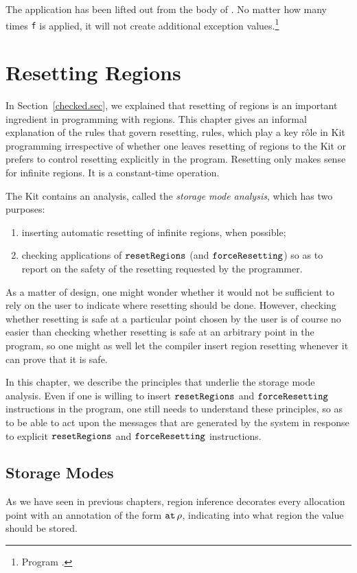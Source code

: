 \documentclass[12pt]{book}
\begin{document}
The application  has been lifted out from the body of
. No matter how many times {\tt f} is applied, it will not
create additional exception values.\footnote{Program
  .}

\chapter{Resetting Regions}
\label{storagemodes.sec}
In Section~\ref{checked.sec}, we explained that 
%
resetting of regions is an important ingredient in programming with
regions.
This chapter gives an informal explanation of the rules that
govern resetting, rules, which play a key r\^ole in Kit programming
irrespective of whether one leaves resetting of regions to the
Kit or prefers to control resetting explicitly in the program.
Resetting only makes sense for infinite regions. It is a 
constant-time operation.

The Kit contains an analysis, called the {\em storage mode analysis}, which has
two purposes:
\begin{enumerate}
\item inserting automatic resetting of infinite regions, when possible;
\item checking applications of $\hbox{\tt resetRegions}$ (and $\hbox{\tt forceResetting}$) so as to 
report on the safety of the resetting requested by the programmer.
\end{enumerate}

As a matter of design, one might wonder whether it would not be sufficient
to rely on the user to indicate where resetting should be done. However,
checking whether resetting is safe at a particular point chosen
by the user is of course no easier than checking whether resetting is safe
at an arbitrary point in the program, so one might as well let the compiler
insert region resetting whenever it can prove that it is safe. 

In this chapter, we describe the principles that underlie the storage
mode analysis. Even if one is willing to insert $\hbox{\tt resetRegions}$ and
$\hbox{\tt forceResetting}$ instructions in the program, one still needs to understand
these principles, so as to be able to act upon the messages that are
generated by the system in response to explicit $\hbox{\tt resetRegions}$ and
$\hbox{\tt forceResetting}$ instructions.
%
\section{Storage Modes}
%
As we have seen in previous chapters, region inference decorates every
%
allocation point with an annotation of the form $\mathbin{\hbox{\tt at}}\,\rho$,
indicating into what region the value should be stored.
\end{document}
